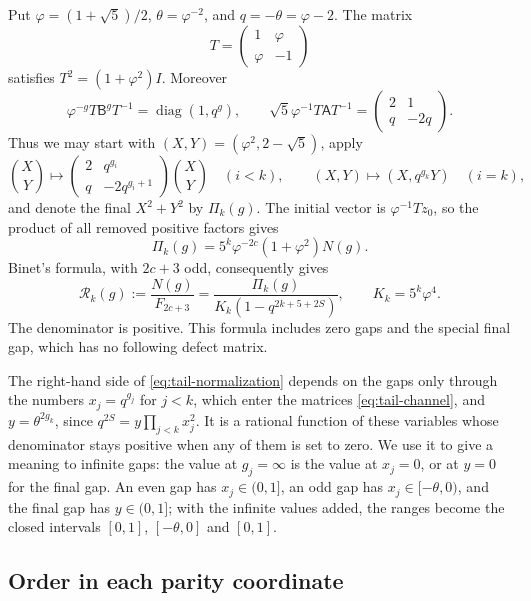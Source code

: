 Put $\varphi=(1+\sqrt5)/2$, $\theta=\varphi^{-2}$, and $q=-\theta=\varphi-2$.
The matrix
$$
 T=\begin{pmatrix}1&\varphi\\\varphi&-1\end{pmatrix}
$$
satisfies $T^2=(1+\varphi^2)I$. Moreover
$$
 \varphi^{-g}T\mathsf B^gT^{-1}=\operatorname{diag}(1,q^g),
 \qquad
 \sqrt5\varphi^{-1}T\mathsf AT^{-1}
 =\begin{pmatrix}2&1\\q&-2q\end{pmatrix}.
$$
Thus we may start with $(X,Y)=(\varphi^2,2-\sqrt5)$, apply
\begin{equation}
 \binom XY\longmapsto
 \begin{pmatrix}2&q^{g_i}\\q&-2q^{g_i+1}\end{pmatrix}\binom XY
 \quad(i<k),
 \qquad (X,Y)\longmapsto(X,q^{g_k}Y)
 \quad(i=k),
 \label{eq:tail-channel}
\end{equation}
and denote the final $X^2+Y^2$ by $\Pi_k(g)$. The initial vector is
$\varphi^{-1}Tz_0$, so the product of all removed positive factors gives
$$
 \Pi_k(g)=5^k\varphi^{-2c}(1+\varphi^2)N(g).
$$
Binet's formula, with $2c+3$ odd, consequently gives
\begin{equation}
 \mathcal R_k(g):=\frac{N(g)}{F_{2c+3}}
 =\frac{\Pi_k(g)}{K_k(1-q^{2k+5+2S})},
 \qquad K_k=5^k\varphi^4.
 \label{eq:tail-normalization}
\end{equation}
The denominator is positive. This formula includes zero gaps and the
special final gap, which has no following defect matrix.

The right-hand side of \eqref{eq:tail-normalization} depends on the gaps
only through the numbers $x_j=q^{g_j}$ for $j<k$, which enter the matrices
\eqref{eq:tail-channel}, and $y=\theta^{2g_k}$, since $q^{2S}=y\prod_{j<k}x_j^2$.
It is a rational function of these variables whose denominator stays
positive when any of them is set to zero. We use it to give a meaning to
infinite gaps: the value at $g_j=\infty$ is the value at $x_j=0$, or at
$y=0$ for the final gap. An even gap has $x_j\in(0,1]$, an odd gap has
$x_j\in[-\theta,0)$, and the final gap has $y\in(0,1]$; with the infinite
values added, the ranges become the closed intervals $[0,1]$, $[-\theta,0]$
and $[0,1]$.

\subsection{Order in each parity coordinate}

